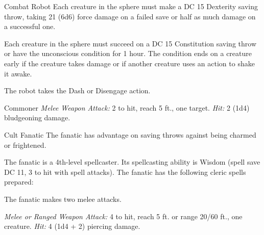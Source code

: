 \documentclass[10pt,a4paper,twoside,bg=print,twocolumn,openany,nodeprecatedcode]{dndbook}
\begin{document}
\begin{DndMonster}[float=t]{Combat Robot}
Each creature in the sphere must make a DC 15 Dexterity saving throw, taking 21 (6d6) force damage on a failed save or half as much damage on a successful one.

Each creature in the sphere must succeed on a DC 15 Constitution saving throw or have the unconscious condition for 1 hour. The condition ends on a creature early if the creature takes damage or if another creature uses an action to shake it awake.

The robot takes the Dash or Disengage action.

\end{DndMonster}



\begin{DndMonster}[float=t]{Commoner}
\DndMonsterBasics[
armor-class = {10},
hit-points = {\DndDice{1d8}},
speed = {30 ft.}
]
\DndMonsterAbilityScores[
 str = 10,
 dex = 10,
 con = 10,
 int = 10,
 wis = 10,
 cha = 10
]
\DndMonsterDetails[
languages = {any one language (usually Common)},
challenge = 0,
]
\textsl{Melee Weapon Attack:} 2 to hit, reach 5 ft., one target. \textsl{Hit:} 2 (1d4) bludgeoning damage.

\end{DndMonster}



\begin{DndMonster}[float=t]{Cult Fanatic}
\DndMonsterBasics[
armor-class = {13 (\textit{leather armor})},
hit-points = {\DndDice{6d8 + 6}},
speed = {30 ft.}
]
\DndMonsterAbilityScores[
 str = 11,
 dex = 14,
 con = 12,
 int = 10,
 wis = 13,
 cha = 14
]
\DndMonsterDetails[
skills = {Deception +4, Persuasion +4, Religion +2},
languages = {any one language (usually Common)},
challenge = 2,
]
The fanatic has advantage on saving throws against being charmed or frightened.

The fanatic is a 4th-level spellcaster. Its spellcasting ability is Wisdom (spell save DC 11, 3 to hit with spell attacks). The fanatic has the following cleric spells prepared:
\begin{DndMonsterSpells}
\end{DndMonsterSpells}
The fanatic makes two melee attacks.

\textsl{Melee or Ranged Weapon Attack:} 4 to hit, reach 5 ft. or range 20/60 ft., one creature. \textsl{Hit:} 4 (1d4 + 2) piercing damage.

\end{DndMonster}
\end{document}

